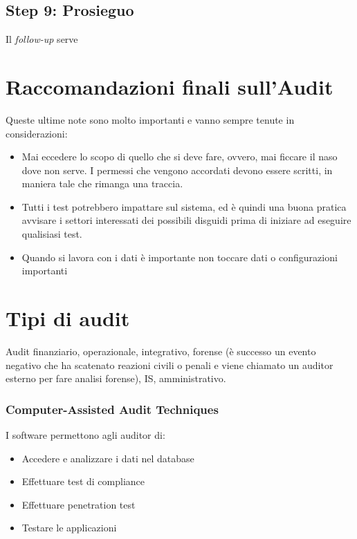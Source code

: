 \subsection{Step 9: Prosieguo}


Il \textit{follow-up} serve 

\section{Raccomandazioni finali sull'Audit}

Queste ultime note sono molto importanti e vanno sempre tenute in considerazioni:
\begin{itemize}
\item Mai eccedere lo scopo di quello che si deve fare, ovvero, mai ficcare il naso dove non serve. I permessi che vengono accordati devono essere scritti, in maniera tale che rimanga una traccia.
\item Tutti i test potrebbero impattare sul sistema, ed è quindi una buona pratica avvisare i settori interessati dei possibili disguidi prima di iniziare ad eseguire qualisiasi test.
\item Quando si lavora con i dati è importante non toccare dati o configurazioni importanti
\end{itemize}


\section{Tipi di audit}

Audit finanziario, operazionale, integrativo, forense (è successo un evento negativo che ha scatenato reazioni civili o penali e viene chiamato un auditor esterno per fare analisi forense), IS, amministrativo.

\subsubsection{Computer-Assisted Audit Techniques}

I software permettono agli auditor di:
\begin{itemize}
\item Accedere e analizzare i dati nel database
\item Effettuare test di compliance
\item Effettuare penetration test
\item Testare le applicazioni
\end{itemize}


